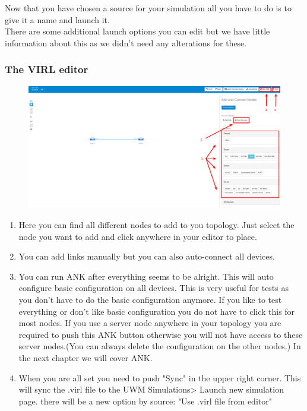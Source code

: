 \documentclass{article}
\begin{document}
Now that you have chosen a source for your simulation all you have to do is to give it a name and launch it.\\
There are some additional launch options you can edit but we have little information about this as we didn't need any alterations for these.

\subsubsection{The VIRL editor}
\begin{figure}[H]
	\centering
	\includegraphics[width=\textwidth]{images/Editor.png}
\end{figure}

\begin{enumerate}
	\item Here you can find all different nodes to add to you topology. Just select the node you want to add and click anywhere in your editor to place.
	\item You can add links manually but you can also auto-connect all devices.
	\item You can run ANK after everything seems to be alright. This will auto configure basic configuration on all devices. This is very useful for tests as you don't have to do the basic configuration anymore. If you like to test everything or don't like basic configuration you do not have to click this for most nodes. If you use a server node anywhere in your topology you are required to push this ANK button otherwise you will not have access to these server nodes.(You can always delete the configuration on the other nodes.) 
	In the next chapter we will cover ANK.
	\item When you are all set you need to push "Sync" in the upper right corner. This will sync the .virl file to the UWM Simulations> Launch new simulation page. there will be a new option by source: "Use .virl file from editor"
\end{enumerate}
\end{document}
